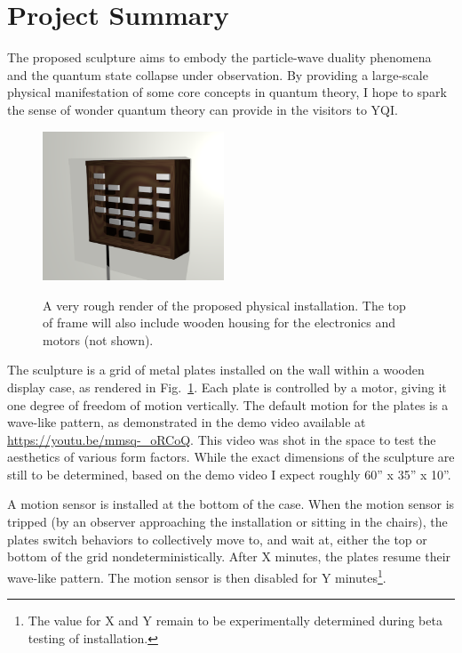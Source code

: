 \section{Project Summary}

The proposed sculpture aims to embody the particle-wave duality phenomena and the quantum state collapse under observation.
By providing a large-scale physical manifestation of some core concepts in quantum theory, I hope to spark the sense of wonder quantum theory can provide in the visitors to YQI.

\begin{figure}[t]
\includegraphics[width=0.48\textwidth]{../Test.png}
\label{fig:render}
\caption{A very rough render of the proposed physical installation. The top of frame will also include wooden housing for the electronics and motors (not shown).}
\end{figure}

The sculpture is a grid of metal plates installed on the wall within a wooden display case, as rendered in Fig.~\ref{fig:render}.
Each plate is controlled by a motor, giving it one degree of freedom of motion vertically.
The default motion for the plates is a wave-like pattern, as demonstrated in the demo video available at \url{https://youtu.be/mmsq-_oRCoQ}.
This video was shot in the space to test the aesthetics of various form factors.
While the exact dimensions of the sculpture are still to be determined, based on the demo video I expect roughly 60'' x 35'' x 10''.

A motion sensor is installed at the bottom of the case.
When the motion sensor is tripped (by an observer approaching the installation or sitting in the chairs), the plates switch behaviors to collectively move to, and wait at, either the top or bottom of the grid nondeterministically.
After X minutes, the plates resume their wave-like pattern. 
The motion sensor is then disabled for Y minutes\footnote{The value for X and Y remain to be experimentally determined during beta testing of installation.}.



